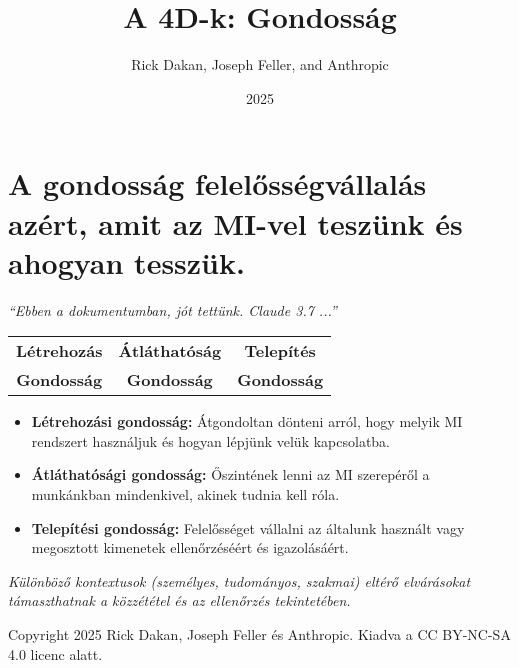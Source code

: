\documentclass[a4paper, 12pt]{article}
\begin{document}
\title{A 4D-k: Gondosság}
\author{Rick Dakan, Joseph Feller, and Anthropic}
\date{2025}
\maketitle

\section*{A gondosság felelősségvállalás azért, amit az MI-vel teszünk és ahogyan tesszük.}
\textit{“Ebben a dokumentumban, jót tettünk. Claude 3.7 ...”}

\begin{center}
\begin{tabular}{ccc}
\textbf{Létrehozás} & \textbf{Átláthatóság} & \textbf{Telepítés} \\
\textbf{Gondosság} & \textbf{Gondosság} & \textbf{Gondosság} \\
\end{tabular}
\end{center}

\begin{itemize}
    \item \textbf{Létrehozási gondosság:} Átgondoltan dönteni arról, hogy melyik MI rendszert használjuk és hogyan lépjünk velük kapcsolatba.
    \item \textbf{Átláthatósági gondosság:} Őszintének lenni az MI szerepéről a munkánkban mindenkivel, akinek tudnia kell róla.
    \item \textbf{Telepítési gondosság:} Felelősséget vállalni az általunk használt vagy megosztott kimenetek ellenőrzéséért és igazolásáért.
\end{itemize}

\textit{Különböző kontextusok (személyes, tudományos, szakmai) eltérő elvárásokat támaszthatnak a közzététel és az ellenőrzés tekintetében.}

\vspace{\fill}
\begin{center}
    \small{Copyright 2025 Rick Dakan, Joseph Feller és Anthropic. Kiadva a CC BY-NC-SA 4.0 licenc alatt.}
\end{center}
\end{document}
